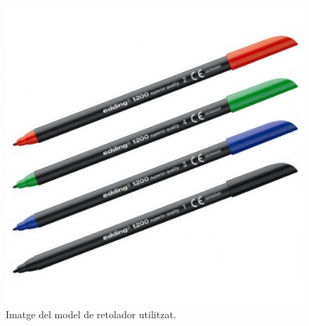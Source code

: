 \begin{figure}[H]
	\centering
	\includegraphics[scale=0.3]{retolador.png}
	\caption{Imatge del model de retolador utilitzat.}
	\label{fig:retolador}
\end{figure}